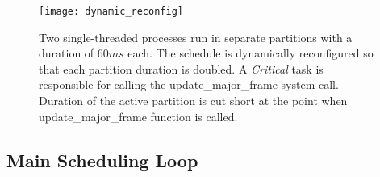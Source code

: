 \begin{figure}[t]
\centering
\texttt{[image: dynamic\_reconfig]}
\caption{Two single-threaded processes run in separate partitions with a duration of $60 ms$ each. The schedule is dynamically reconfigured so that each partition duration is doubled. 
A \emph{Critical} task is responsible for calling the update\_major\_frame system call. Duration of the active partition is cut short at the point when update\_major\_frame function is called. 
}
\label{fig:dynamic_reconfig}
\end{figure}




%
	
\vspace{-0.1in}
\subsection{Main Scheduling Loop}	
\label{sec:scheduling}

